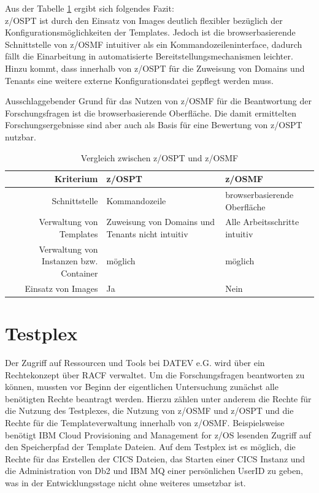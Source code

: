 Aus der Tabelle \ref{tab:vglzosptzosmf} ergibt sich folgendes Fazit:\\
z/OSPT ist durch den Einsatz von Images deutlich flexibler bezüglich der Konfigurationsmöglichkeiten der Templates.
Jedoch ist die browserbasierende Schnittstelle von z/OSMF intuitiver als ein Kommandozeileninterface, dadurch fällt die Einarbeitung in automatisierte Bereitstellungsmechanismen leichter.
Hinzu kommt, dass innerhalb von z/OSPT für die Zuweisung von Domains und Tenants eine weitere externe Konfigurationsdatei gepflegt werden muss.

Ausschlaggebender Grund für das Nutzen von z/OSMF für die Beantwortung der Forschungsfragen ist die browserbasierende Oberfläche.
Die damit ermittelten Forschungsergebnisse sind aber auch als Basis für eine Bewertung von z/OSPT nutzbar.
\begin{table}
\centering
\begin{tabularx}{\textwidth}{r|X|X}
Kriterium & z/OSPT & z/OSMF\\
\hline
Schnittstelle & Kommandozeile & browserbasierende Oberfläche\\
\hline
Verwaltung von Templates & Zuweisung von Domains und Tenants nicht intuitiv & Alle Arbeitsschritte intuitiv\\
\hline
Verwaltung von Instanzen bzw. Container &  möglich & möglich\\
\hline
Einsatz von Images & Ja & Nein\\
\end{tabularx}
\caption{Vergleich zwischen z/OSPT und z/OSMF}
\label{tab:vglzosptzosmf}
\end{table}

\section{Testplex}
Der Zugriff auf Ressourcen und Tools bei DATEV e.G. wird über ein Rechtekonzept über RACF verwaltet. 
Um die Forschungsfragen beantworten zu können, mussten vor Beginn der eigentlichen Untersuchung zunächst alle benötigten Rechte beantragt werden.
Hierzu zählen unter anderem die Rechte für die Nutzung des Testplexes, die Nutzung von z/OSMF und z/OSPT und die Rechte für die Templateverwaltung innerhalb von z/OSMF. 
Beispielsweise benötigt \glqq IBM Cloud Provisioning and Management for z/OS\grqq{} lesenden Zugriff auf den Speicherpfad der Template Dateien.
Auf dem Testplex ist es  möglich, die Rechte für das Erstellen der CICS Dateien, das Starten einer CICS Instanz und die Administration von Db2 und IBM MQ einer persönlichen UserID zu geben, was in der Entwicklungsstage nicht ohne weiteres umsetzbar ist. 

